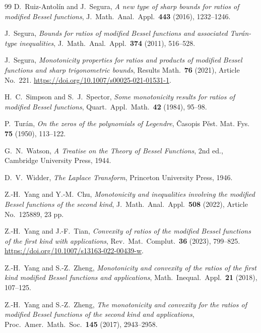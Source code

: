 \documentclass[preprint,12pt]{elsarticle}
\theoremstyle{plain}
\theoremstyle{definition}
\theoremstyle{remark}
\begin{document}
\begin{thebibliography}{99}
D.~Ruiz-Antol\'in and J.~Segura,
\emph{A new type of sharp bounds for ratios of modified Bessel functions},
J.\ Math.\ Anal.\ Appl.\ \textbf{443} (2016), 1232--1246.

J.~Segura,
\emph{Bounds for ratios of modified Bessel functions and associated
Tur\'an-type inequalities},
J.\ Math.\ Anal.\ Appl.\ \textbf{374} (2011), 516--528.

J.~Segura,
\emph{Monotonicity properties for ratios and products of modified Bessel
functions and sharp trigonometric bounds},
Results Math.\ \textbf{76} (2021), Article No.~221.
\url{https://doi.org/10.1007/s00025-021-01531-1}.

H.~C.~Simpson and S.~J.~Spector,
\emph{Some monotonicity results for ratios of modified Bessel functions},
Quart.\ Appl.\ Math.\ \textbf{42} (1984), 95--98.

P.~Tur\'an,
\emph{On the zeros of the polynomials of Legendre},
\v{C}asopis P\v{e}st. Mat. Fys. \textbf{75} (1950), 113--122.

G.~N.~Watson,
\emph{A Treatise on the Theory of Bessel Functions},
2nd ed., Cambridge University Press, 1944.

D.~V.~Widder,
\emph{The Laplace Transform},
Princeton University Press, 1946.

Z.-H.~Yang and Y.-M.~Chu,
\emph{Monotonicity and inequalities involving the modified Bessel functions of
the second kind},
J.\ Math.\ Anal.\ Appl.\ \textbf{508} (2022), Article No.~125889, 23 pp.

Z.-H.~Yang and J.-F.~Tian,
\emph{Convexity of ratios of the modified Bessel functions of the first kind
with applications},
Rev.\ Mat.\ Complut.\ \textbf{36} (2023), 799--825.
\url{https://doi.org/10.1007/s13163-022-00439-w}.

Z.-H.~Yang and S.-Z.~Zheng,
\emph{Monotonicity and convexity of the ratios of the first kind modified
Bessel functions and applications},
Math.\ Inequal.\ Appl.\ \textbf{21} (2018), 107--125.

Z.-H.~Yang and S.-Z.~Zheng,
\emph{The monotonicity and convexity for the ratios of modified Bessel
functions of the second kind and applications},
Proc.\ Amer.\ Math.\ Soc.\ \textbf{145} (2017), 2943--2958.

\end{thebibliography}
\end{document}
